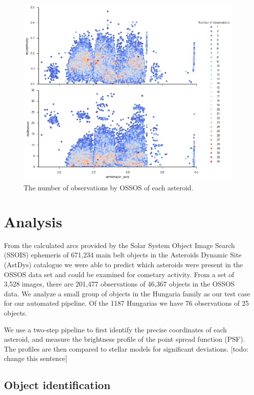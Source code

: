 \documentclass[iop,apj]{emulateapj}
\begin{document}
\begin{figure}[!htb]
    \centering
    \includegraphics[width=\linewidth]{graphs/occurance2.png}
    \caption{The number of observations by OSSOS of each asteroid.}\label{fig:6}
\end{figure}

\section{Analysis}

From the calculated arcs provided by the Solar System Object Image Search (SSOIS) ephemeris \citep{ssois} of 671,234 main belt objects in the Asteroids Dynamic Site (AstDys) catalogue \citep{astdys} we were able to predict which asteroids were present in the OSSOS data set and could be examined for cometary activity. From a set of 3,528 images, there are 201,477 observations of 46,367 objects in the OSSOS data. We analyze a small group of objects in the Hungaria family as our test case for our automated pipeline. Of the 1187 Hungarias we have 76 observations of 25 objects. 

We use a two-step pipeline to first identify the precise coordinates of each asteroid, and measure the brightness profile of the point spread function (PSF). The profiles are then compared to stellar models for significant deviations. [todo: change this sentence]

\subsection{Object identification}
\end{document}
